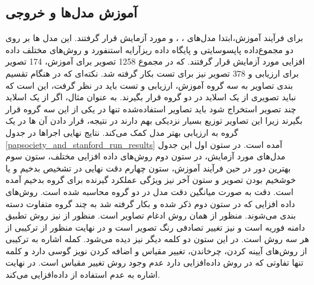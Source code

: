 \subsection{آموزش مدل‌ها و خروجی}\label{subsec:آموزش مدل‌ها و خروجی}
برای فرآیند آموزش،ابتدا مدل‌های ، ،  و   مورد آزمایش قرار گرفتند. این مدل ها بر روی دو مجموع‌داده پاپسوسایتی و پایگاه داده ریزآرایه استنفورد و روش‌های مختلف داده افزایی مورد آزمایش قرار گرفتند. که در مجموع 1258 تصویر برای آموزش، 174 تصویر برای ارزیابی و 378 تصویر نیز برای تست بکار گرفته شد. نکته‌ای که در هنگام تقسیم بندی تصاویر به سه گروه آموزش، ارزیابی و تست باید در نظر گرفت، این است که نباید تصویری از یک اسلاید در دو گروه قرار بگیرند. به عنوان مثال، اگر از یک اسلاید چند تصویر استخراج شود باید تصاویر استفاده‌شده تنها در یکی از این سه گروه قرار بگیرند زیرا این تصاویر توزیع بسیار نزدیکی بهم دارند در نتیجه، قرار دادن آن ها در یک گروه به ارزیابی بهتر مدل کمک می‌کند.
نتایج نهایی اجراها در جدول \ref{papsociety_and_stanford_run_results} آمده است.
در ستون اول این جدول مدل‌های مورد آزمایش، در ستون دوم روش‌های داده افزایی مختلف، ستون سوم بهترین دور در حین فرآیند آموزش، ستون چهارم دقت نهایی در تشخیص بدخیم و یا خوشخیم بودن تصویر و ستون آخر نیز ویژگی عملکرد گیرنده برای گروه بدخیم آمده است. دقت به صورت میانگین دقت مدل در دو گروه محاسبه شده است.
روش‌های داده افزایی که در ستون دوم ذکر شده و بکار گرفته شد به چند گروه متفاوت دسته بندی می‌شوند. منظور از  همان روش ادغام تصاویر است. منظور از  نیز روش تطبیق دامنه فوریه است و  نیز تغییر تصادفی رنگ تصویر است و در نهایت منظور از  ترکیبی از هر سه روش است. در این ستون دو کلمه دیگر نیز دیده می‌شود. کمله  اشاره به ترکیبی از روش‌های آیینه کردن، چرخاندن، تغییر مقیاس و اضافه کردن نویز گوسی دارد و کلمه  تنها تفاوتی که در روش داده‌افزایی دارد عدم وجود روش تغییر مقیاس است. در نهایت  اشاره به عدم استفاده از داده‌افزایی می‌کند.
